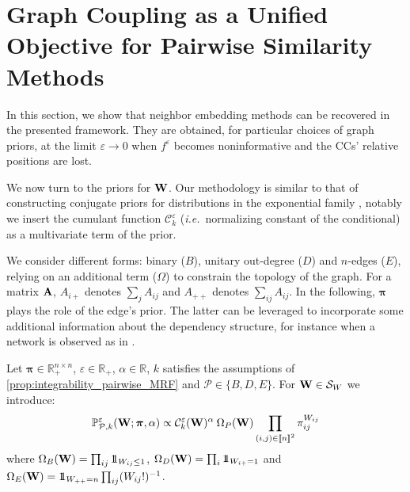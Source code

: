 \section{Graph Coupling as a Unified Objective for Pairwise Similarity Methods}\label{sec:GC_unified}

In this section, we show that neighbor embedding methods can be recovered in the presented framework. They are obtained, for particular choices of graph priors, at the limit $\varepsilon \to 0$ when $f^{\varepsilon}$ becomes noninformative and the CCs' relative positions are lost. 

We now turn to the priors for $\mathbf{W}$. Our methodology is similar to that of constructing conjugate priors for distributions in the exponential family \citep{wainwright2008graphical}, notably we insert the cumulant function $\mathcal{C}_k^{\varepsilon}$ (\textit{i.e.}\ normalizing constant of the conditional) as a multivariate term of the prior. 

We consider different forms: binary ($B$), unitary out-degree ($D$) and $n$-edges ($E$), relying on an additional term ($\Omega$) to constrain the topology of the graph. For a matrix $\mathbf{A}$, $A_{i+}$ denotes $\sum_j A_{ij}$ and $A_{++}$ denotes $\sum_{ij} A_{ij}$. In the following, $\bm{\pi}$ plays the role of the edge's prior. The latter can be leveraged to incorporate some additional information about the dependency structure, for instance when a network is observed as in \cite{li2020high}. 

\begin{definition}\label{def:prior_W}
Let $\bm{\pi} \in \mathbb{R}_+^{n \times n}$, $\varepsilon \in \mathbb{R}_+$, $\alpha \in \mathbb{R}$, $k$ satisfies the assumptions of \cref{prop:integrability_pairwise_MRF} and $\mathcal{P} \in \{B,D,E\}$. For $\mathbf{W} \in \mathcal{S}_{W}$ we introduce:
$$\mathbb{P}_{\mathcal{P},k}^{\varepsilon}(\mathbf{W}; \bm{\pi}, \alpha) \propto \mathcal{C}^{\varepsilon}_k(\mathbf{W})^{\alpha} \: \Omega_{P}(\mathbf{W}) \prod_{(i,j) \in {[\![n]\!]}^2} \pi_{ij}^{W_{ij}}$$
where $\Omega_{B}(\mathbf{W}) = \prod_{ij} 1\!\!1_{W_{ij} \leq 1}$, $\Omega_{D}(\mathbf{W}) = \prod_{i} 1\!\!1_{W_{i+} = 1}$ and $\Omega_{E}(\mathbf{W}) = 1\!\!1_{W_{++} = n}\prod_{ij}(W_{ij}!)^{-1}$.
\end{definition}

